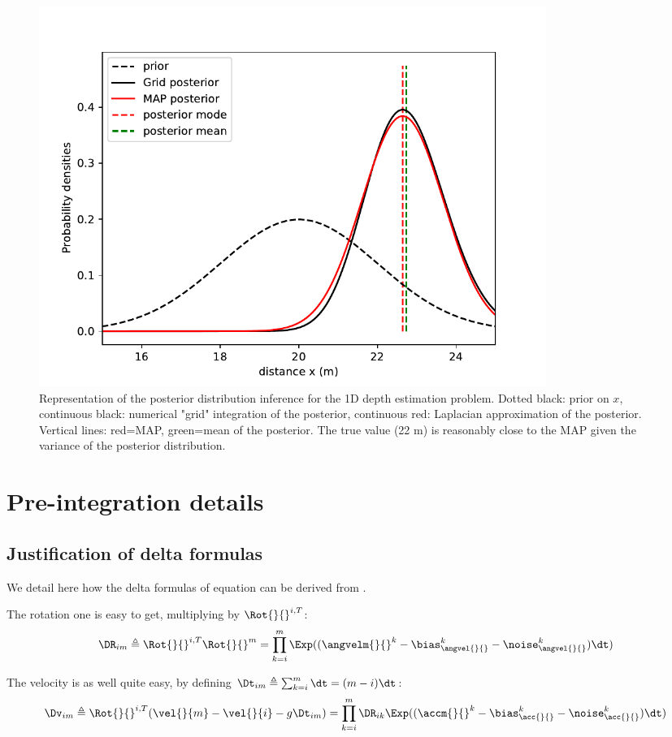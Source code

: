 \begin{figure}[h]
    \centering
    \includegraphics[width=0.8\textwidth]{figures/MAP_stereo1D.pdf}
    \caption{Representation of the posterior distribution inference for the 1D depth estimation problem. Dotted black: prior on $x$, 
    continuous black: numerical "grid" integration of the posterior, continuous red: Laplacian approximation of the posterior. 
    Vertical lines: red=MAP, green=mean of the posterior. The true value (22 m) is reasonably close to the MAP given the variance 
    of the posterior distribution.
    }
    \label{fig:MAP_stereo1D}
 \end{figure}







\chapter{Pre-integration details}
\section{Justification of \cite{forster2017-TRO} delta formulas}
\label{sec:forster_proof}
We detail here how the delta formulas of equation  can be derived from .

The rotation one is easy to get, multiplying by $\Rot{}{}^{i,T}$:
\begin{equation}
    \DR_{im} \triangleq \Rot{}{}^{i,T} \Rot{}{}^{m} = \prod_{k=i}^{m} \Exp((\angvelm{}{}^k - \bias_{\angvel{}{}}^k - \noise_{\angvel{}{}}^k)\dt)
    \label{eq:IMUDeltaR}
\end{equation}

The velocity is as well quite easy, by defining $\Dt_{im} \triangleq \sum_{k=i}^{m} \dt = (m-i)\dt$:
\begin{equation}
    \Dv_{im} \triangleq \Rot{}{}^{i,T} (\vel{}{m} - \vel{}{i} - g \Dt_{im}) 
    = \prod_{k=i}^{m} \DR_{ik} \Exp((\accm{}{}^k - \bias_{\acc{}{}}^k - \noise_{\acc{}{}}^k)\dt)
    \label{eq:IMUDeltav}
\end{equation}

